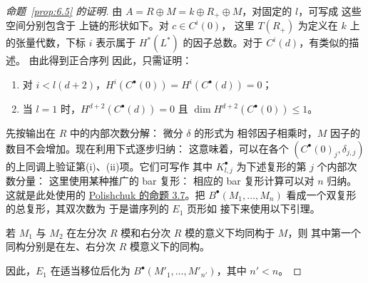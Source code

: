 \begin{proof}[命题~\ref{prop:6.5} 的证明]
由 $A=R\oplus M=k\oplus R_+\oplus M$，对固定的 $l$，可写成
这些空间分别包含于
上链的形状如下。对 $c\in C^i(0)$，
这里 $T(R_+)$ 为定义在 $k$ 上的张量代数，下标 $i$ 表示属于 $H^*(L^*)$ 的因子总数。对于 $C^i(d)$，有类似的描述。
由此得到正合序列
因此，只需证明：
\begin{enumerate}[label=(\roman*)]
\item 对 $i<l(d+2)$，$H^i(C^\bullet(0))=H^i(C^\bullet(d))=0$；
\item 当 $l=1$ 时，$H^{d+2}(C^\bullet(d))=0$ 且 $\dim H^{d+2}(C^\bullet(0))\le1$。
\end{enumerate}
先按输出在 $R$ 中的内部次数分解：
微分 $\delta$ 的形式为
相邻因子相乘时，$M$ 因子的数目不会增加。现在利用下式逐步归纳：
这意味着，可以在各个 $(C^\bullet(0)_j,\delta_{j,j})$ 的上同调上验证第(i)、(ii)项。它们可写作
其中 $K^\bullet_{l,j}$ 为下述复形的第 $j$ 个内部次数分量：
这里使用某种推广的 bar 复形：
相应的 bar 复形计算可以对 $n$ 归纳。这就是此处使用的 \href{https://arxiv.org/abs/math/0302178}{Polishchuk 的命题 3.7}。把 $B^\bullet(M_1,\ldots,M_n)$ 看成一个双复形的总复形，其双次数为
于是谱序列的 $E_1$ 页形如
接下来使用以下引理。
\begin{lemma}\label{lem:6.7}
若 $M_1$ 与 $M_2$ 在左分次 $R$ 模和右分次 $R$ 模的意义下均同构于 $M$，则
其中第一个同构分别是在左、右分次 $R$ 模意义下的同构。
\end{lemma}
因此，$E_1$ 在适当移位后化为 $B^\bullet(M'_1,\ldots,M'_{n'})$，其中 $n'<n$。
\end{proof}\endgroup

